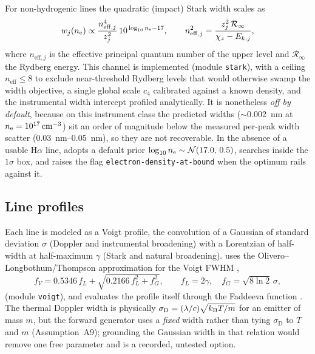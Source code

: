 For non-hydrogenic lines the quadratic (impact) Stark width
\citep{griem1974broadening,griem1968semiempirical,konjevic1999nonhydrogenic} scales as
%
\begin{equation}
  \label{eq:stark-quad}
  w_j(n_{\mathrm{e}}) \propto \frac{n_{\mathrm{eff},j}^4}{z_j^2}\,
    10^{\,\log_{10}n_{\mathrm{e}} - 17},
  \qquad
  n_{\mathrm{eff},j}^2 = \frac{z_j^2\,\mathcal{R}_\infty}{\chi_z - E_{k,j}},
\end{equation}
%
where $n_{\mathrm{eff},j}$ is the effective principal quantum number of the upper
level and $\mathcal{R}_\infty$ the Rydberg energy. This channel is implemented
(module \texttt{stark}), with a ceiling $n_{\mathrm{eff}}\le 8$ to exclude
near-threshold Rydberg levels that would otherwise swamp the width objective, a
single global scale $c_4$ calibrated against a known density, and the instrumental
width intercept profiled analytically. It is nonetheless \emph{off by default},
because on this instrument class the predicted widths ($\sim$\SI{0.002}{\nano\meter}
at $n_{\mathrm{e}}=\SI{e17}{\per\cubic\centi\meter}$) sit an order of magnitude below the
measured per-peak width scatter (\SIrange{0.03}{0.05}{\nano\meter}), so they are not
recoverable. In the absence of a usable H$\alpha$ line, \alibz{} adopts a default
prior $\log_{10}n_{\mathrm{e}} \sim \mathcal{N}(17.0,\,0.5)$, searches inside the $1\sigma$ box,
and raises the flag \texttt{electron-density-at-bound} when the optimum rails against
it.

\subsection{Line profiles}
\label{sec:theory-profiles}

Each line is modeled as a Voigt profile, the convolution of a Gaussian of standard
deviation $\sigma$ (Doppler and instrumental broadening) with a Lorentzian of
half-width at half-maximum $\gamma$ (Stark and natural broadening). \alibz{} uses the
Olivero--Longbothum/Thompson approximation for the Voigt FWHM
\citep{olivero1977voigt,thompson1987voigt},
%
\begin{equation}
  \label{eq:voigt-fwhm}
  f_V = 0.5346\,f_L + \sqrt{0.2166\,f_L^2 + f_G^2},
  \qquad f_L = 2\gamma,\quad f_G = \sqrt{8\ln 2}\,\sigma,
\end{equation}
%
(module \texttt{voigt}), and evaluates the profile itself through the Faddeeva
function \citep{humlicek1982voigt,virtanen2020scipy}.
The thermal Doppler width is physically
$\sigma_\mathrm{D} = (\lambda/c)\sqrt{k_{\mathrm{B}} T/m}$ for an emitter of mass $m$, but the
forward generator uses a \emph{fixed} width rather than tying $\sigma_\mathrm{D}$ to
$T$ and $m$ (Assumption~A9); grounding the Gaussian width in that relation would remove
one free parameter and is a recorded, untested option.

